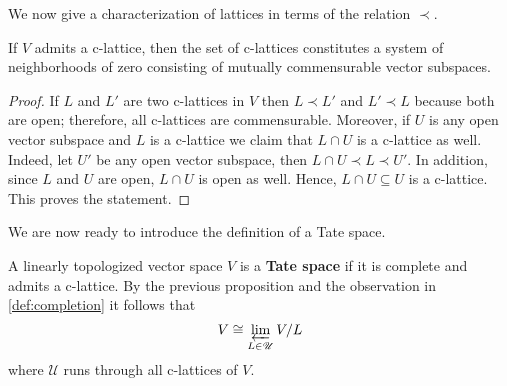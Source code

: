We now give a characterization of lattices in terms of the relation $\prec$.
\begin{proposition}\label{prop:lattices-are-basis}
	If $V$ admits a c-lattice, then the set of c-lattices constitutes a system of neighborhoods of zero consisting of mutually commensurable vector subspaces.
\end{proposition}
\begin{proof}
	If $L$ and $L'$ are two c-lattices in $V$ then $L \prec L'$ and $L' \prec L$ because both are open; therefore, all c-lattices are commensurable. Moreover, if $U$ is any open vector subspace and $L$ is a c-lattice we claim that $L \cap U$ is a c-lattice as well. Indeed, let $U'$ be any open vector subspace, then $L\cap U \prec L\prec U'$. In addition, since $L$ and $U$ are open, $L \cap U$ is open as well. Hence, $L \cap U \subseteq U$ is a c-lattice. This proves the statement.
\end{proof}
We are now ready to introduce the definition of a Tate space.
\begin{definition}\label{def:tate-vector-space}
	A linearly topologized vector space $V$ is a \textbf{Tate space} if it is complete and admits a c-lattice. By the previous proposition and the observation in \cref{def:completion} it follows that
	\[
		V \cong \varprojlim_{L \in \mathscr{U}} V/L
	\]
	where $\mathscr{U}$ runs through all c-lattices of $V$.
\end{definition}

